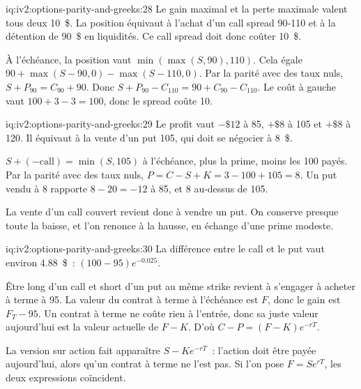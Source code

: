 \begin{solution}{iq:iv2:options-parity-and-greeks:28}
Le gain maximal et la perte maximale valent tous deux 10~\$. La position équivaut à l'achat d'un call spread 90-110 et à la détention de 90~\$ en liquidités. Ce call spread doit donc coûter 10~\$.

À l'échéance, la position vaut $\min(\max(S, 90), 110)$. Cela égale $90 + \max(S - 90, 0) - \max(S - 110, 0)$. Par la parité avec des taux nuls, $S + P_{90} = C_{90} + 90$. Donc $S + P_{90} - C_{110} = 90 + C_{90} - C_{110}$. Le coût à gauche vaut $100 + 3 - 3 = 100$, donc le spread coûte 10.

\end{solution}

\begin{solution}{iq:iv2:options-parity-and-greeks:29}
Le profit vaut $-\$12$ à 85, $+\$8$ à 105 et $+\$8$ à 120. Il équivaut à la vente d'un put 105, qui doit se négocier à 8~\$.

$S + (-\text{call}) = \min(S, 105)$ à l'échéance, plus la prime, moins les 100 payés. Par la parité avec des taux nuls, $P = C - S + K = 3 - 100 + 105 = 8$. Un put vendu à 8 rapporte $8 - 20 = -12$ à 85, et 8 au-dessus de 105.

La vente d'un call couvert revient donc à vendre un put. On conserve presque toute la baisse, et l'on renonce à la hausse, en échange d'une prime modeste.

\end{solution}

\begin{solution}{iq:iv2:options-parity-and-greeks:30}
La différence entre le call et le put vaut environ 4.88~\$~: $(100 - 95)e^{-0.025}$.

Être long d'un call et short d'un put au même strike revient à s'engager à acheter à terme à 95. La valeur du contrat à terme à l'échéance est $F$, donc le gain est $F_T - 95$. Un contrat à terme ne coûte rien à l'entrée, donc sa juste valeur aujourd'hui est la valeur actuelle de $F - K$. D'où $C - P = (F - K)e^{-rT}$.

La version sur action fait apparaître $S - Ke^{-rT}$~: l'action doit être payée aujourd'hui, alors qu'un contrat à terme ne l'est pas. Si l'on pose $F = Se^{rT}$, les deux expressions coïncident.

\end{solution}

